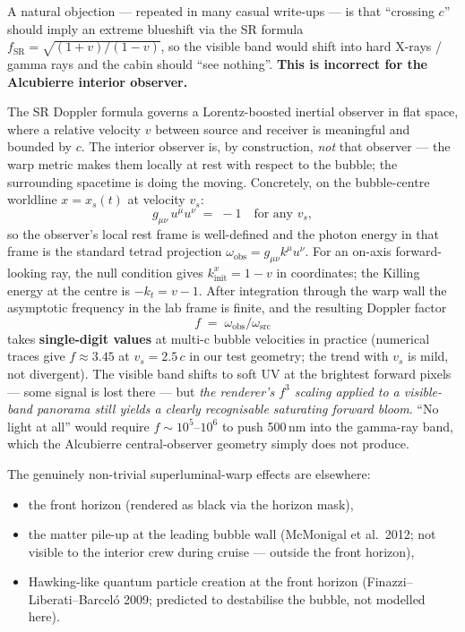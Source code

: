 \documentclass[11pt]{article}
\begin{document}
A natural objection — repeated in many casual write-ups — is that
``crossing $c$'' should imply an extreme blueshift via the SR formula
\(f_{\text{SR}}=\sqrt{(1+v)/(1-v)}\), so the visible band would shift
into hard X-rays / gamma rays and the cabin should ``see nothing''.
\textbf{This is incorrect for the Alcubierre interior observer.}

The SR Doppler formula governs a Lorentz-boosted inertial observer in
flat space, where a relative velocity $v$ between source and receiver
is meaningful and bounded by $c$.  The interior observer is, by
construction, \emph{not} that observer — the warp metric makes them
locally at rest with respect to the bubble; the surrounding spacetime
is doing the moving.  Concretely, on the bubble-centre worldline
$x = x_s(t)$ at velocity $v_s$:
\begin{equation}
g_{\mu\nu}\,u^\mu u^\nu \;=\; -1 \quad\text{for any }v_s,
\end{equation}
so the observer's local rest frame is well-defined and the photon
energy in that frame is the standard tetrad projection
$\omega_{\text{obs}}=g_{\mu\nu}k^\mu u^\nu$.  For an on-axis
forward-looking ray, the null condition gives $k^x_{\text{init}} = 1-v$
in coordinates; the Killing energy at the centre is
$-k_t = v - 1$.  After integration through the warp wall the
asymptotic frequency in the lab frame is finite, and the resulting
Doppler factor
\begin{equation}
f \;=\; \omega_{\text{obs}}/\omega_{\text{src}}
\end{equation}
takes \textbf{single-digit values} at multi-c bubble velocities in
practice (numerical traces give $f \approx 3.45$ at $v_s = 2.5\,c$ in
our test geometry; the trend with $v_s$ is mild, not divergent).
The visible band shifts to soft UV at the brightest forward pixels —
some signal is lost there — but \emph{the renderer's $f^3$ scaling
applied to a visible-band panorama still yields a clearly recognisable
saturating forward bloom}.  ``No light at all'' would require
$f \sim 10^5$–$10^6$ to push 500\,nm into the gamma-ray band, which
the Alcubierre central-observer geometry simply does not produce.

The genuinely non-trivial superluminal-warp effects are elsewhere:
\begin{itemize}[leftmargin=*]
\item the front horizon (rendered as black via the horizon mask),
\item the matter pile-up at the leading bubble wall (McMonigal et al.\
      2012; not visible to the interior crew during cruise — outside
      the front horizon),
\item Hawking-like quantum particle creation at the front horizon
      (Finazzi--Liberati--Barceló 2009; predicted to destabilise the
      bubble, not modelled here).
\end{itemize}
\end{document}
